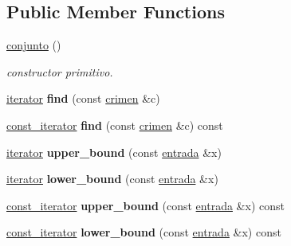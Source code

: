 \subsection*{Public Member Functions}
\begin{DoxyCompactItemize}
\item 
\hypertarget{classconjunto_ab634a250097d154d69a13bf8bde9fec7}{}\hyperlink{classconjunto_ab634a250097d154d69a13bf8bde9fec7}{conjunto} ()\label{classconjunto_ab634a250097d154d69a13bf8bde9fec7}

\begin{DoxyCompactList}\small\item\em constructor primitivo. \end{DoxyCompactList}\item 
\hypertarget{classconjunto_a72ee85a4309acdd8274392fc4a765de4}{}\hyperlink{classconjunto_1_1iterator}{iterator} {\bfseries find} (const \hyperlink{classcrimen}{crimen} \&c)\label{classconjunto_a72ee85a4309acdd8274392fc4a765de4}

\item 
\hypertarget{classconjunto_adc065d4751136dbf69b7b74bc7ca0684}{}\hyperlink{classconjunto_1_1const__iterator}{const\+\_\+iterator} {\bfseries find} (const \hyperlink{classcrimen}{crimen} \&c) const \label{classconjunto_adc065d4751136dbf69b7b74bc7ca0684}

\item 
\hypertarget{classconjunto_a495b52c4b03342ce220f17e224ccda3e}{}\hyperlink{classconjunto_1_1iterator}{iterator} {\bfseries upper\+\_\+bound} (const \hyperlink{classconjunto_a7630ace7cb17bcec07daf5804f1a0780}{entrada} \&x)\label{classconjunto_a495b52c4b03342ce220f17e224ccda3e}

\item 
\hypertarget{classconjunto_a9701de4810e99b6d0154462acb6a46af}{}\hyperlink{classconjunto_1_1iterator}{iterator} {\bfseries lower\+\_\+bound} (const \hyperlink{classconjunto_a7630ace7cb17bcec07daf5804f1a0780}{entrada} \&x)\label{classconjunto_a9701de4810e99b6d0154462acb6a46af}

\item 
\hypertarget{classconjunto_ae9460e883908ad60b6806d04ab57b7de}{}\hyperlink{classconjunto_1_1const__iterator}{const\+\_\+iterator} {\bfseries upper\+\_\+bound} (const \hyperlink{classconjunto_a7630ace7cb17bcec07daf5804f1a0780}{entrada} \&x) const \label{classconjunto_ae9460e883908ad60b6806d04ab57b7de}

\item 
\hypertarget{classconjunto_a18395c2165b2f0235021a76d3751c787}{}\hyperlink{classconjunto_1_1const__iterator}{const\+\_\+iterator} {\bfseries lower\+\_\+bound} (const \hyperlink{classconjunto_a7630ace7cb17bcec07daf5804f1a0780}{entrada} \&x) const \label{classconjunto_a18395c2165b2f0235021a76d3751c787}


\end{DoxyCompactItemize}
